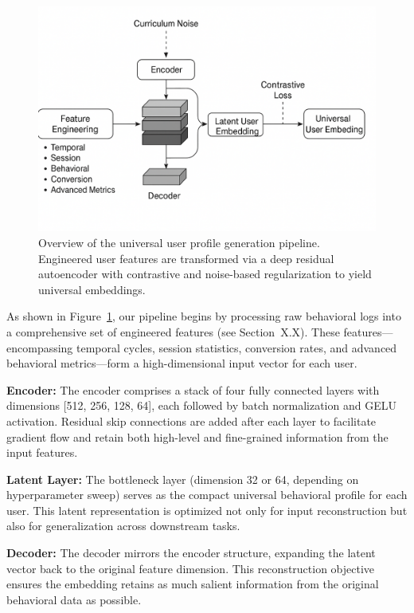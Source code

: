 \documentclass[sigconf]{acmart}
\begin{document}
\begin{figure}[t]
  \centering
  \includegraphics[width=0.9\linewidth]{images/autoencoder_pipeline_diagram.png}
  \caption{Overview of the universal user profile generation pipeline. Engineered user features are transformed via a deep residual autoencoder with contrastive and noise-based regularization to yield universal embeddings.}
  \label{fig:architecture}
\end{figure}

As shown in Figure~\ref{fig:architecture}, our pipeline begins by processing raw behavioral logs into a comprehensive set of engineered features (see Section~X.X). These features—encompassing temporal cycles, session statistics, conversion rates, and advanced behavioral metrics—form a high-dimensional input vector for each user.

\textbf{Encoder:}  
The encoder comprises a stack of four fully connected layers with dimensions [512, 256, 128, 64], each followed by batch normalization and GELU activation. Residual skip connections are added after each layer to facilitate gradient flow and retain both high-level and fine-grained information from the input features.

\textbf{Latent Layer:}  
The bottleneck layer (dimension 32 or 64, depending on hyperparameter sweep) serves as the compact universal behavioral profile for each user. This latent representation is optimized not only for input reconstruction but also for generalization across downstream tasks.

\textbf{Decoder:}  
The decoder mirrors the encoder structure, expanding the latent vector back to the original feature dimension. This reconstruction objective ensures the embedding retains as much salient information from the original behavioral data as possible.
\end{document}
